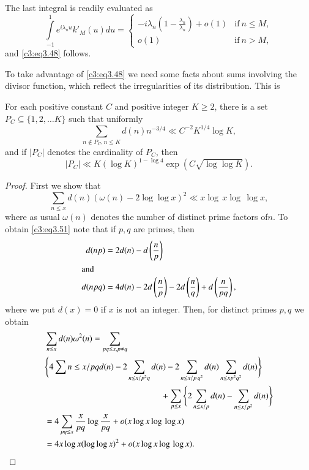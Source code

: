 The last integral is readily evaluated as 
$$ 
\int\limits_{-1}^1 e^{i \lambda_n u} k'_M(u) du= 
\begin{cases} 
  - i \lambda_n \left(1- \frac{\lambda_n}{\lambda_n}\right) + o(1) &
  \text{if}~ n \leq M,\\
  o(1) & \text{if}~ n > M,
\end{cases}
$$
and \eqref{c3:eq3.48} follows.

To take advantage of \eqref{c3:eq3.48} we need some facts about sums
involving the divisor function, which reflect the irregularities of
its distribution. This is 

\begin{lemma}\label{c3:lem3.5}
  For each positive constant $C$ and positive integer $K \geq 2$,
  there is a set $P_C \subseteq \{1, 2, \ldots K\}$ such that
  uniformly
  $$
  \sum_{n \notin P_C, n \leq K} d(n) n^{-3/4} \ll C^{-2} K^{1/4} \log K,
  $$
  and if $|P_C|$ denotes the cardinality of $P_C$, then 
  $$
  |P_C| \ll K(\log K)^{1- \log 4} \exp \left(C\sqrt{\log \log K} \right).
  $$
\end{lemma}

\begin{proof}
  First we show that
  \begin{equation}
    \sum_{n \leq x} d(n) (\omega (n)- 2 \log \log x)^2 \ll x \log\, x
    \log\, \log x,\label{c3:eq3.51} 
  \end{equation}
  where as usual $\omega (n)$ denotes the number of distinct prime
  factors of\pageoriginale $n$. To obtain \eqref{c3:eq3.51} note that
  if $p, q$ are primes, then 
  \begin{align*}
    d (np) & = 2d (n) - d \left(\frac{n}{p} \right)\\
    \intertext{and}
    d(n pq) & = 4 d(n) - 2d\left(\frac{n}{p} \right)- 2d
    \left(\frac{n}{q}\right)+ d\left(\frac{n}{pq} \right),
  \end{align*}
  where we put $d(x) =0$ if $x$ is not an integer. Then, for distinct
  primes $p, q$ we obtain
  \begin{align*}
    & \sum_{n \leq x} d(n) \omega^2 (n)= \sum_{pq \leq x, p \neq q}\\
    & \Bigg\{ 4 \sum{n \leq x/pq} d(n) -2 \sum_{n \leq x/p^2 q} d(n) -2
    \sum_{n \leq x/p \, q^2} d(n)\sum_{n \leq x p^2 q^2} d(n)
    \Bigg\}\\ 
    & \hspace{4.8cm}+ \sum_{p \leq x} \Bigg\{
    2 \sum_{n \leq x/p} d(n) - \sum_{n \leq x/p^2} d(n)\Bigg\}\\
    & = 4 \sum_{pq \leq x} \frac{x}{pq} \log \frac{x}{pq} + o(x \log x
    \log \, \log x)\\
    & = 4 x \log x (\log \log x)^2 + o(x \log x \log \, \log x). 
  \end{align*}
\end{proof}

